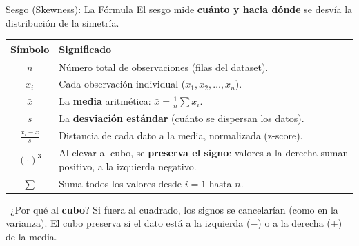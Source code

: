 \documentclass[aspectratio=169, 11pt]{beamer}
\begin{document}
\begin{frame}[shrink=15]{Sesgo (Skewness): La Fórmula}
  \vspace{-4pt}
  {\footnotesize
    El sesgo mide \textbf{cuánto y hacia dónde} se desvía la distribución de la simetría.}

  \vspace{6pt}
  \begin{center}
  \end{center}

  \vspace{4pt}
  {\scriptsize
  \begin{tabular}{@{}cl@{}}
    \toprule
    \textbf{Símbolo} & \textbf{Significado} \\
    \midrule
    $n$ & Número total de observaciones (filas del dataset). \\
    $x_i$ & Cada observación individual ($x_1, x_2, \ldots, x_n$). \\
    $\bar{x}$ & La \textbf{media} aritmética: $\bar{x} = \frac{1}{n}\sum x_i$. \\
    $s$ & La \textbf{desviación estándar} (cuánto se dispersan los datos). \\
    $\frac{x_i - \bar{x}}{s}$ & Distancia de cada dato a la media, normalizada (z-score). \\
    $(\cdot)^3$ & Al elevar al cubo, se \textbf{preserva el signo}: valores a la derecha suman positivo, a la izquierda negativo. \\
    $\sum$ & Suma todos los valores desde $i=1$ hasta $n$. \\
    \bottomrule
  \end{tabular}
  }

  \vspace{4pt}
  {\scriptsize\color{textMuted}
    \faLightbulb\ ¿Por qué al \textbf{cubo}?
    Si fuera al cuadrado, los signos se cancelarían (como en la varianza).
    El cubo preserva si el dato está a la izquierda ($-$) o a la derecha ($+$) de la media.}
\end{frame}
\end{document}
